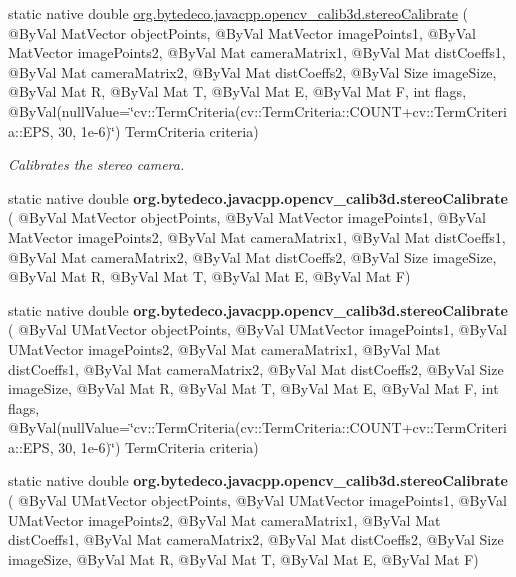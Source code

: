 \begin{DoxyCompactItemize}
\item 
static native double \hyperlink{group__calib3d_gab585e0688b9d7592dfe294c5179bdcae}{org.\+bytedeco.\+javacpp.\+opencv\+\_\+calib3d.\+stereo\+Calibrate} ( @By\+Val Mat\+Vector object\+Points, @By\+Val Mat\+Vector image\+Points1, @By\+Val Mat\+Vector image\+Points2, @By\+Val Mat camera\+Matrix1, @By\+Val Mat dist\+Coeffs1, @By\+Val Mat camera\+Matrix2, @By\+Val Mat dist\+Coeffs2, @By\+Val Size image\+Size, @By\+Val Mat R, @By\+Val Mat T, @By\+Val Mat E, @By\+Val Mat F, int flags, @By\+Val(null\+Value=\char`\"{}cv\+::\+Term\+Criteria(cv\+::\+Term\+Criteria\+::\+C\+O\+U\+NT+cv\+::\+Term\+Criteria\+::\+E\+PS, 30, 1e-\/6)\char`\"{}) Term\+Criteria criteria)
\begin{DoxyCompactList}\small\item\em Calibrates the stereo camera. \end{DoxyCompactList}\item 
\mbox{\label{group__calib3d_ga45a28cdc336fc7edf7788c4ed71ee62c}} 
static native double {\bfseries org.\+bytedeco.\+javacpp.\+opencv\+\_\+calib3d.\+stereo\+Calibrate} ( @By\+Val Mat\+Vector object\+Points, @By\+Val Mat\+Vector image\+Points1, @By\+Val Mat\+Vector image\+Points2, @By\+Val Mat camera\+Matrix1, @By\+Val Mat dist\+Coeffs1, @By\+Val Mat camera\+Matrix2, @By\+Val Mat dist\+Coeffs2, @By\+Val Size image\+Size, @By\+Val Mat R, @By\+Val Mat T, @By\+Val Mat E, @By\+Val Mat F)
\item 
\mbox{\label{group__calib3d_ga72d7457b1f79f64c03be7df36719b4d0}} 
static native double {\bfseries org.\+bytedeco.\+javacpp.\+opencv\+\_\+calib3d.\+stereo\+Calibrate} ( @By\+Val U\+Mat\+Vector object\+Points, @By\+Val U\+Mat\+Vector image\+Points1, @By\+Val U\+Mat\+Vector image\+Points2, @By\+Val Mat camera\+Matrix1, @By\+Val Mat dist\+Coeffs1, @By\+Val Mat camera\+Matrix2, @By\+Val Mat dist\+Coeffs2, @By\+Val Size image\+Size, @By\+Val Mat R, @By\+Val Mat T, @By\+Val Mat E, @By\+Val Mat F, int flags, @By\+Val(null\+Value=\char`\"{}cv\+::\+Term\+Criteria(cv\+::\+Term\+Criteria\+::\+C\+O\+U\+NT+cv\+::\+Term\+Criteria\+::\+E\+PS, 30, 1e-\/6)\char`\"{}) Term\+Criteria criteria)
\item 
\mbox{\label{group__calib3d_gae002f53756679810d9c202db5d0a6c67}} 
static native double {\bfseries org.\+bytedeco.\+javacpp.\+opencv\+\_\+calib3d.\+stereo\+Calibrate} ( @By\+Val U\+Mat\+Vector object\+Points, @By\+Val U\+Mat\+Vector image\+Points1, @By\+Val U\+Mat\+Vector image\+Points2, @By\+Val Mat camera\+Matrix1, @By\+Val Mat dist\+Coeffs1, @By\+Val Mat camera\+Matrix2, @By\+Val Mat dist\+Coeffs2, @By\+Val Size image\+Size, @By\+Val Mat R, @By\+Val Mat T, @By\+Val Mat E, @By\+Val Mat F)

\end{DoxyCompactItemize}
